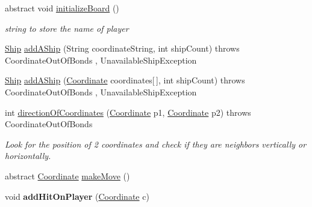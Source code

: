 \begin{DoxyCompactItemize}
\item 
abstract void \hyperlink{classbattleGame_1_1src_1_1versionGUI_1_1Player_ab4fef2f3cd8fdec477af910c8797edbc}{initialize\+Board} ()\hypertarget{classbattleGame_1_1src_1_1versionGUI_1_1Player_ab4fef2f3cd8fdec477af910c8797edbc}{}\label{classbattleGame_1_1src_1_1versionGUI_1_1Player_ab4fef2f3cd8fdec477af910c8797edbc}

\begin{DoxyCompactList}\small\item\em string to store the name of player \end{DoxyCompactList}\item 
\hyperlink{classbattleGame_1_1src_1_1versionGUI_1_1Ship}{Ship} \hyperlink{classbattleGame_1_1src_1_1versionGUI_1_1Player_aa3b8b9efab505e3eb9200336137aadf5}{add\+A\+Ship} (String coordinate\+String, int ship\+Count)  throws Coordinate\+Out\+Of\+Bonds , Unavailable\+Ship\+Exception 
\item 
\hyperlink{classbattleGame_1_1src_1_1versionGUI_1_1Ship}{Ship} \hyperlink{classbattleGame_1_1src_1_1versionGUI_1_1Player_a0e8eaba04b5a759dcb86f550fabbb192}{add\+A\+Ship} (\hyperlink{classbattleGame_1_1src_1_1versionGUI_1_1Coordinate}{Coordinate} coordinates\mbox{[}$\,$\mbox{]}, int ship\+Count)  throws Coordinate\+Out\+Of\+Bonds , Unavailable\+Ship\+Exception 
\item 
int \hyperlink{classbattleGame_1_1src_1_1versionGUI_1_1Player_adc3fecd1897bf7ebea1f1251f072a21e}{direction\+Of\+Coordinates} (\hyperlink{classbattleGame_1_1src_1_1versionGUI_1_1Coordinate}{Coordinate} p1, \hyperlink{classbattleGame_1_1src_1_1versionGUI_1_1Coordinate}{Coordinate} p2)  throws Coordinate\+Out\+Of\+Bonds
\begin{DoxyCompactList}\small\item\em Look for the position of 2 coordinates and check if they are neighbors vertically or horizontally. \end{DoxyCompactList}\item 
abstract \hyperlink{classbattleGame_1_1src_1_1versionGUI_1_1Coordinate}{Coordinate} \hyperlink{classbattleGame_1_1src_1_1versionGUI_1_1Player_ac6f8b666efadd259312e94af143c6397}{make\+Move} ()
\item 
void {\bfseries add\+Hit\+On\+Player} (\hyperlink{classbattleGame_1_1src_1_1versionGUI_1_1Coordinate}{Coordinate} c)\hypertarget{classbattleGame_1_1src_1_1versionGUI_1_1Player_a4cec2e70db8720ceba5db3f146f88517}{}\label{classbattleGame_1_1src_1_1versionGUI_1_1Player_a4cec2e70db8720ceba5db3f146f88517}

\end{DoxyCompactItemize}


